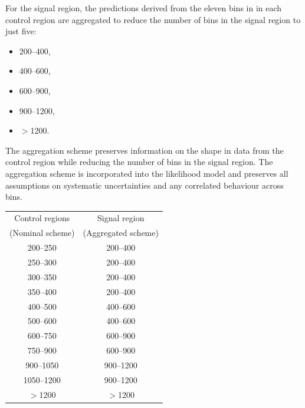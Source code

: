 For the signal region, the predictions derived from the eleven bins in
\scalht in each control region are aggregated to reduce the number of
\scalht bins in the signal region to just five: 
\begin{itemize}
\item 200--400, 
\item 400--600,
\item 600--900, 
\item 900--1200, 
\item $>$1200\GeV.  
\end{itemize}

The aggregation scheme preserves information on the \scalht shape in
data from the control region while reducing the number of bins in the
signal region. The aggregation scheme is incorporated into the
likelihood model and preserves all assumptions on systematic
uncertainties and any correlated behaviour across bins. 

\begin{table}[!h]
  \label{tab:ht-aggr}
  \centering
  \begin{tabular}{ cc }
    \hline
    Control regions  & Signal region       \\
    (Nominal scheme) & (Aggregated scheme) \\
    \hline
    200--250         & 200--400            \\
    250--300         & 200--400            \\
    300--350         & 200--400            \\
    350--400         & 200--400            \\
    \hline
    400--500         & 400--600            \\
    500--600         & 400--600            \\
    \hline
    600--750         & 600--900            \\
    750--900         & 600--900            \\
    \hline
    900--1050        & 900--1200           \\
    1050--1200       & 900--1200           \\
    \hline
    $>$1200          & $>$1200             \\
    \hline
  \end{tabular}
\end{table}

